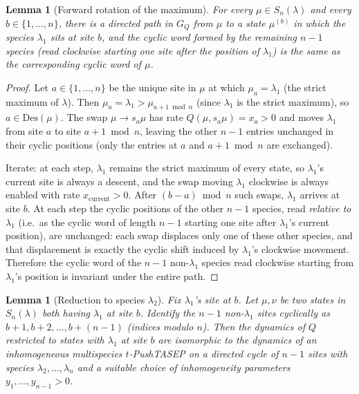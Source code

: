 \documentclass[12pt]{article}
\newtheorem{lemma}[theorem]{Lemma}
\theoremstyle{definition}
\begin{document}
\begin{lemma}[Forward rotation of the maximum]\label{lem:rotmax}
For every $\mu\in S_n(\lambda)$ and every $b\in\{1,\dots,n\}$, there is
a directed path in $G_Q$ from $\mu$ to a state $\mu^{(b)}$ in which the
species $\lambda_1$ sits at site $b$, and the cyclic word formed by the
remaining $n-1$ species (read clockwise starting one site after the
position of $\lambda_1$) is the same as the corresponding cyclic word
of $\mu$.
\end{lemma}

\begin{proof}
Let $a\in\{1,\dots,n\}$ be the unique site in $\mu$ at which
$\mu_a=\lambda_1$ (the strict maximum of $\lambda$). Then $\mu_a=\lambda_1
>\mu_{a+1\bmod n}$ (since $\lambda_1$ is the strict maximum), so
$a\in\mathrm{Des}(\mu)$. The swap $\mu\to s_a\mu$ has rate
$Q(\mu,s_a\mu)=x_a>0$ and moves $\lambda_1$ from site $a$ to site
$a+1\bmod n$, leaving the other $n-1$ entries unchanged in their cyclic
positions (only the entries at $a$ and $a+1\bmod n$ are exchanged).

Iterate: at each step, $\lambda_1$ remains the strict maximum of every
state, so $\lambda_1$'s current site is always a descent, and the swap
moving $\lambda_1$ clockwise is always enabled with rate
$x_{\text{current}}>0$. After $(b-a)\bmod n$ such swaps, $\lambda_1$
arrives at site $b$. At each step the cyclic positions of the other
$n-1$ species, read \emph{relative to $\lambda_1$} (i.e.\ as the cyclic
word of length $n-1$ starting one site after $\lambda_1$'s current
position), are unchanged: each swap displaces only one of these other
species, and that displacement is exactly the cyclic shift induced by
$\lambda_1$'s clockwise movement. Therefore the cyclic word of the
$n-1$ non-$\lambda_1$ species read clockwise starting from
$\lambda_1$'s position is invariant under the entire path.
\end{proof}

\begin{lemma}[Reduction to species $\lambda_2$]\label{lem:reduce}
Fix $\lambda_1$'s site at $b$. Let $\mu,\nu$ be two states in
$S_n(\lambda)$ both having $\lambda_1$ at site $b$. Identify the $n-1$
non-$\lambda_1$ sites cyclically as $b+1, b+2,\dots, b+(n-1)$ (indices
modulo $n$). Then the dynamics of $Q$ \emph{restricted to states with
$\lambda_1$ at site $b$} are isomorphic to the dynamics of an
inhomogeneous multispecies $t$-PushTASEP on a directed cycle of
\emph{$n-1$ sites} with species $\lambda_2,\dots,\lambda_n$ and a
suitable choice of inhomogeneity parameters $y_1,\dots,y_{n-1}>0$.
\end{lemma}
\end{document}
